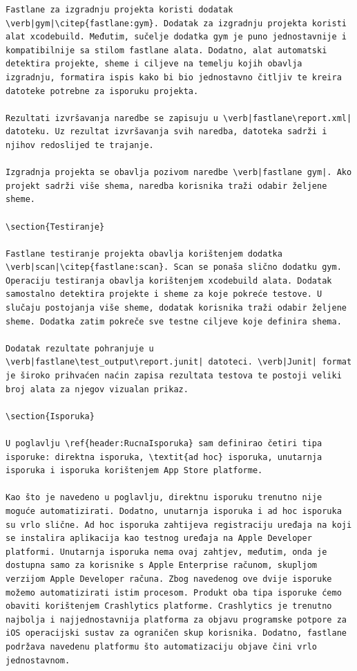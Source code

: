 \documentclass[times, utf8, diplomski, numeric]{fer}
\begin{document}
\begin{appendices}
\begin{lstlisting}[caption=Provjera postojanja i pokretanje Swiftlint alata, label=listing:swiftlint]
Fastlane za izgradnju projekta koristi dodatak \verb|gym|\citep{fastlane:gym}. Dodatak za izgradnju projekta koristi alat xcodebuild. Međutim, sučelje dodatka gym je puno jednostavnije i kompatibilnije sa stilom fastlane alata. Dodatno, alat automatski detektira projekte, sheme i ciljeve na temelju kojih obavlja izgradnju, formatira ispis kako bi bio jednostavno čitljiv te kreira datoteke potrebne za isporuku projekta.

Rezultati izvršavanja naredbe se zapisuju u \verb|fastlane\report.xml| datoteku. Uz rezultat izvršavanja svih naredba, datoteka sadrži i njihov redoslijed te trajanje.

Izgradnja projekta se obavlja pozivom naredbe \verb|fastlane gym|. Ako projekt sadrži više shema, naredba korisnika traži odabir željene sheme.

\section{Testiranje}

Fastlane testiranje projekta obavlja korištenjem dodatka \verb|scan|\citep{fastlane:scan}. Scan se ponaša slično dodatku gym. Operaciju testiranja obavlja korištenjem xcodebuild alata. Dodatak samostalno detektira projekte i sheme za koje pokreće testove. U slučaju postojanja više sheme, dodatak korisnika traži odabir željene sheme. Dodatka zatim pokreče sve testne ciljeve koje definira shema.

Dodatak rezultate pohranjuje u \verb|fastlane\test_output\report.junit| datoteci. \verb|Junit| format je široko prihvaćen naćin zapisa rezultata testova te postoji veliki broj alata za njegov vizualan prikaz.

\section{Isporuka}

U poglavlju \ref{header:RucnaIsporuka} sam definirao četiri tipa isporuke: direktna isporuka, \textit{ad hoc} isporuka, unutarnja isporuka i isporuka korištenjem App Store platforme.

Kao što je navedeno u poglavlju, direktnu isporuku trenutno nije moguće automatizirati. Dodatno, unutarnja isporuka i ad hoc isporuka su vrlo slične. Ad hoc isporuka zahtijeva registraciju uređaja na koji se instalira aplikacija kao testnog uređaja na Apple Developer platformi. Unutarnja isporuka nema ovaj zahtjev, međutim, onda je dostupna samo za korisnike s Apple Enterprise računom, skupljom verzijom Apple Developer računa. Zbog navedenog ove dvije isporuke možemo automatizirati istim procesom. Produkt oba tipa isporuke ćemo obaviti korištenjem Crashlytics platforme. Crashlytics je trenutno najbolja i najjednostavnija platforma za objavu programske potpore za iOS operacijski sustav za ograničen skup korisnika. Dodatno, fastlane podržava navedenu platformu što automatizaciju objave čini vrlo jednostavnom.


\end{lstlisting}
\end{appendices}
\end{document}
